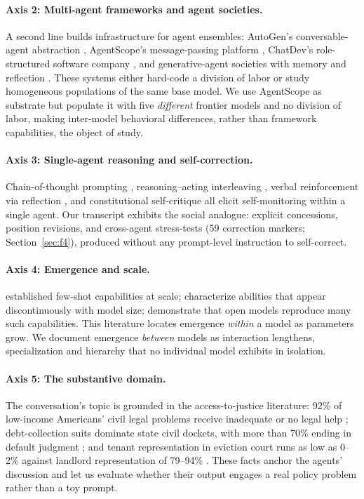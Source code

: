 \documentclass[sigconf,nonacm=true]{acmart}
\begin{document}
\paragraph{Axis 2: Multi-agent frameworks and agent societies.} A second line builds infrastructure for agent ensembles: AutoGen's conversable-agent abstraction \citep{wu2023autogen}, AgentScope's message-passing platform \citep{agentscope}, ChatDev's role-structured software company \citep{huang2023chatdev}, and generative-agent societies with memory and reflection \citep{park2023generative}. These systems either hard-code a division of labor or study homogeneous populations of the same base model. We use AgentScope as substrate but populate it with five \emph{different} frontier models and no division of labor, making inter-model behavioral differences, rather than framework capabilities, the object of study.

\paragraph{Axis 3: Single-agent reasoning and self-correction.} Chain-of-thought prompting \citep{wei2022cot}, reasoning--acting interleaving \citep{yao2023react}, verbal reinforcement via reflection \citep{shinn2023reflexion}, and constitutional self-critique \citep{bai2022constitutional} all elicit self-monitoring within a single agent. Our transcript exhibits the social analogue: explicit concessions, position revisions, and cross-agent stress-tests (59 correction markers; Section~\ref{sec:f4}), produced without any prompt-level instruction to self-correct.

\paragraph{Axis 4: Emergence and scale.} \citet{brown2020gpt3} established few-shot capabilities at scale; \citet{wei2022emergent} characterize abilities that appear discontinuously with model size; \citet{touvron2023llama} demonstrate that open models reproduce many such capabilities. This literature locates emergence \emph{within} a model as parameters grow. We document emergence \emph{between} models as interaction lengthens, specialization and hierarchy that no individual model exhibits in isolation.

\paragraph{Axis 5: The substantive domain.} The conversation's topic is grounded in the access-to-justice literature: 92\% of low-income Americans' civil legal problems receive inadequate or no legal help \citep{lsc2022justicegap}; debt-collection suits dominate state civil dockets, with more than 70\% ending in default judgment \citep{pew2020debt}; and tenant representation in eviction court runs as low as 0--2\% against landlord representation of 79--94\% \citep{nccrc_eviction}. These facts anchor the agents' discussion and let us evaluate whether their output engages a real policy problem rather than a toy prompt.
\end{document}
